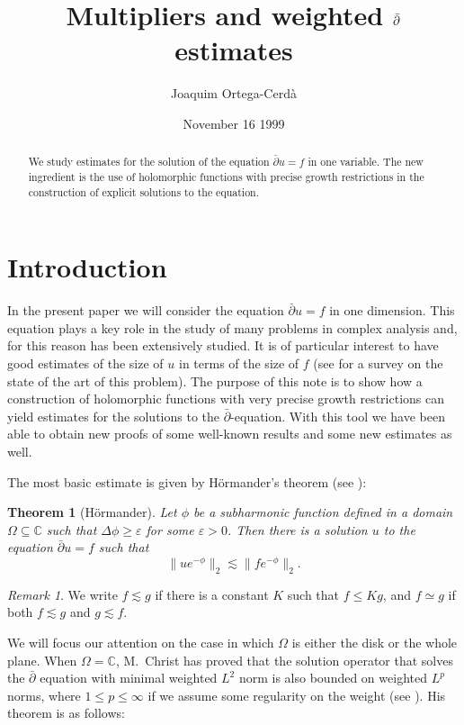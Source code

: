 \documentclass[12pt,twoside,final,psamsfonts]{amsart}
\title{Multipliers and weighted $\dbar$ estimates}
\author{Joaquim Ortega-Cerd\`a}
\date{November 16 1999}
\theoremstyle{plain}
\newtheorem*{teor*}{Theorem}
\theoremstyle{remark}
\newtheorem*{remark}{Remark}
\theoremstyle{definition}
\newcommand{\C}{{\mathbb C}}
\newcommand{\dbar}{\bar\partial}
\begin{document}
 

\begin{abstract} 
We study estimates for the solution of the equation $\dbar u=f$ in one
variable. The new ingredient is the use of holomorphic functions with precise
growth restrictions in the construction of explicit solutions to the equation.
\end{abstract}

\maketitle
\section{Introduction}  
In the present paper we will consider the equation $\dbar u =f$ in one
dimension. This equation plays a key role in the study of many problems in
complex analysis and, for this reason has been extensively studied. It is of
particular interest to have good estimates of the size of $u$ in terms of the
size of $f$ (see \cite{Berndtsson94} for a survey on the state of the art of
this problem). The purpose of this note is to show how a construction of
holomorphic functions with very precise growth restrictions can yield estimates
for the solutions to the $\dbar$-equation. With this tool we have been able to
obtain new proofs of some well-known results and some new estimates as well.

The most basic estimate is given by H\"ormander's theorem 
(see \cite[p.~92]{Hormander90a}):

\begin{teor*}[H\"ormander] 
Let $\phi$ be a subharmonic function defined in a
domain $\Omega\subseteq \C$ such that $\Delta \phi \ge \varepsilon$ for some
$\varepsilon>0$. Then there is  a solution $u$ to the equation $\dbar u=f$ such
that 
\[ \|ue^{-\phi}\|_2\lesssim \|fe^{-\phi}\|_2. 
\] 
\end{teor*}

\begin{remark} We write $f\lesssim g$ if there is a constant $K$ such that
$f\le K g$, and $f\simeq g$ if both $f\lesssim g$ and $g\lesssim f$.
\end{remark}

We will focus our attention on the case in which $\Omega$ is either the disk or
the whole plane. When $\Omega=\C$, M.~Christ has proved that the 
solution operator that solves the $\dbar$ equation with minimal weighted $L^2$
norm is also bounded  on weighted $L^p$ norms, where $1\le p\le \infty$ if we
assume some regularity on the weight (see \cite{Christ91}). His theorem is as
follows:
\end{document}
